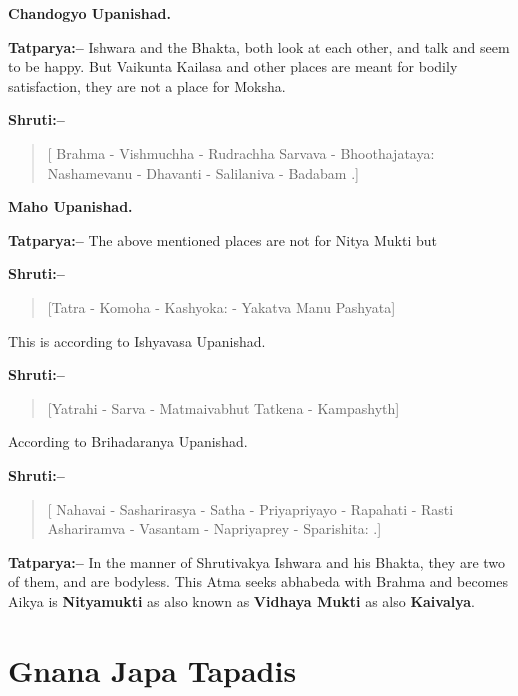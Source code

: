 \begin{flushright}
\textbf{Chandogyo Upanishad.}
\end{flushright}

\textbf{Tatparya:–} Ishwara and the Bhakta, both look at each other, and talk and seem to be happy. But Vaikunta Kailasa and other places are meant for bodily satisfaction, they are not a place for Moksha.

\textbf{Shruti:–}

\begin{verse}
[ Brahma - Vishmuchha - Rudrachha Sarvava - Bhoothajataya:  Nashamevanu - Dhavanti - Salilaniva - Badabam .]
\end{verse}

\begin{flushright}
\textbf{Maho Upanishad.}
\end{flushright}

\textbf{Tatparya:–} The above mentioned places are not for Nitya Mukti but

\textbf{Shruti:–}

\begin{verse}
[Tatra - Komoha - Kashyoka: - Yakatva Manu Pashyata]
\end{verse}

This is according to Ishyavasa Upanishad.

\textbf{Shruti:–}

\begin{verse}
[Yatrahi - Sarva - Matmaivabhut  Tatkena - Kampashyth]
\end{verse}

According to Brihadaranya Upanishad.

\textbf{Shruti:–}

\begin{verse}
[ Nahavai - Sasharirasya - Satha - Priyapriyayo - Rapahati - Rasti  Ashariramva - Vasantam - Napriyaprey - Sparishita: .]
\end{verse}

\textbf{Tatparya:–} In the manner of Shrutivakya Ishwara and his Bhakta, they are two of them, and are bodyless. This Atma seeks abhabeda with Brahma and becomes Aikya is \textbf{Nityamukti} as also known as \textbf{Vidhaya Mukti} as also \textbf{Kaivalya}.

\chapter{Gnana Japa Tapadis}

